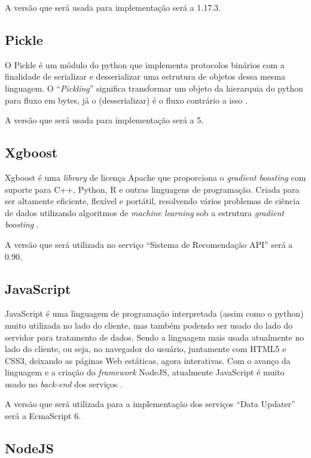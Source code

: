 A versão que será usada para implementação será a 1.17.3.

\subsection{Pickle}

O Pickle é um módulo do python que implementa protocolos binários com a finalidade de serializar e desserializar uma estrutura de objetos dessa mesma linguagem. O “\textit{Pickling}” significa transformar um objeto da hierarquia do python para fluxo em bytes, já o (desserializar) é o fluxo contrário a isso \cite{pickle:2019}.

A versão que será usada para implementação será a 5.

\subsection{Xgboost}

Xgboost é uma \textit{library} de licença Apache que proporciona o \textit{gradient boosting} com suporte para C++, Python, R e outras linguagens de programação. Criada para ser altamente eficiente, flexível e portátil, resolvendo vários problemas de ciência de dados utilizando algoritmos de \textit{machine learning} sob a estrutura \textit{gradient boosting} \cite{XGBOOST:2019}.

A versão que será utilizada no serviço “Sistema de Recomendação API” será a 0.90.

\subsection{JavaScript}

JavaScript é uma linguagem de programação interpretada (assim como o python) muito utilizada no lado do cliente, mas também podendo ser usado do lado do servidor para tratamento de dados. Sendo a linguagem mais usada atualmente no lado do cliente, ou seja, no navegador do usuário, juntamente com HTML5 e CSS3, deixando as páginas Web estáticas, agora interativas. Com o avanço da linguagem e a criação do \textit{framework} NodeJS, atualmente JavaScript é muito usado no \textit{back-end} dos serviços \cite{JavaScript:2019}.

A versão que será utilizada para a implementação dos serviços “Data Updater” será a EcmaScript 6.

\subsection{NodeJS}

